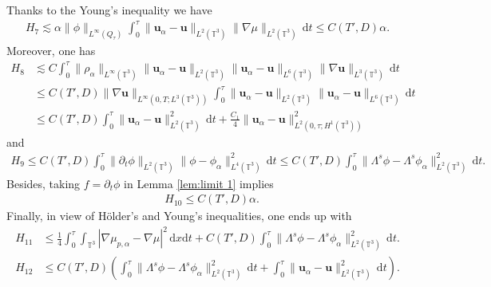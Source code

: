 \documentclass[reqno,a4paper,11pt]{amsart}
\theoremstyle{plain}
\numberwithin{equation}{section}
\newcommand{\bb}[1]{\mathbb{#1}}
\newcommand{\bbt}{\bb{T}}
\renewcommand{\d}{\mathrm{d}}
\newcommand{\dxdt}{\,\d x \d t}
\newcommand{\dt}{\d t}
\begin{document}
				
				Thanks to  the Young's inequality  we have
				\begin{align}
					\label{mode54-229}
					H_{7}
					\lesssim\alpha \|\phi\|_{L^{\infty}(Q_\tau)}\int_0^\tau\|\mathbf{u}_{\alpha}-\mathbf{u}\|_{L^{2}(\mathbb{T}^{3})}\|\nabla\mu\|_{L^{2}(\mathbb{T}^{3})}\,\dt\leq C(T',D)\alpha.
				\end{align}
				Moreover, one has
				\begin{align}
					\label{mode54-2210}
					\nonumber H_{8}
					&\lesssim C\int_0^\tau\|\rho_{\alpha}\|_{L^{\infty}(\mathbb{T}^{3})}\|\mathbf{u}_{\alpha}-\mathbf{u}\|_{L^{2}(\mathbb{T}^{3})}\|\mathbf{u}_{\alpha}-\mathbf{u}\|_{L^{6}(\mathbb{T}^{3})}\|\nabla\mathbf{u}\|_{L^{3}(\mathbb{T}^{3})}\,\dt
					\\&\leq \nonumber  C(T',D)\|\nabla\mathbf{u}\|_{L^{\infty}(0,T;L^{3}(\mathbb{T}^{3}))} \int_0^\tau\|\mathbf{u}_{\alpha}-\mathbf{u}\|_{L^{2}(\mathbb{T}^{3})}\|\mathbf{u}_{\alpha}-\mathbf{u}\|_{L^{6}(\mathbb{T}^{3})}\,\dt
					\\&\leq  C(T',D)\int_0^\tau\|\mathbf{u}_{\alpha}-\mathbf{u}\|_{L^{2}(\mathbb{T}^{3})}^{2}\,\dt
					+\frac{C_1}{4} \| \mathbf{u}_{\alpha}-\mathbf{u}\|_{L^2(0,\tau;H^{1}(\mathbb{T}^{3}))}^{2}
				\end{align}
				and
				\begin{align}
					\label{mode54-2211}
					H_{9}
					\leq C(T',D)\int_0^\tau\|\partial_{t}\phi\|_{L^{2}(\mathbb{T}^{3})}\|\phi-\phi_{\alpha}\|^{2}_{L^{4}(\mathbb{T}^{3})}\,\dt
					\leq  C(T',D) \int_0^\tau\|\Lambda^s\phi-\Lambda^s\phi_{\alpha}\|_{L^{2}(\bbt^3)}^2\,\dt.
				\end{align}
				Besides, taking $f=\partial _{t}\phi$ in  Lemma \ref{lem:limit 1}  implies
				\begin{align}
					\label{mode54-2212}
					&  H_{10}
					\leq  C(T',D)\alpha.
				\end{align}
				Finally, in view of H\"older's and Young's inequalities, one ends up with
				\begin{align}
					\label{mode54-H11}
					H_{11}
					&\leq \frac{1}{4}\int_0^{\tau}\int_{\mathbb{T}^{3}}|\nabla \mu_{p,\alpha}-\nabla \mu|^{2}\dxdt+C(T',D) \int_0^\tau\|\Lambda^s\phi-\Lambda^s\phi_{\alpha}\|_{L^{2}(\bbt^3)}^2\,\dt.
					\\
					\label{mode54-H12}
					H_{12}&\leq C(T',D)\left( \int_0^\tau\|\Lambda^s\phi-\Lambda^s\phi_{\alpha}\|_{L^{2}(\bbt^3)}^2\,\dt+\int_0^\tau\|\mathbf{u}_{\alpha}-\mathbf{u}\|_{L^{2}(\mathbb{T}^{3})}^{2}\,\dt\right).
				\end{align}
				
\end{document}
